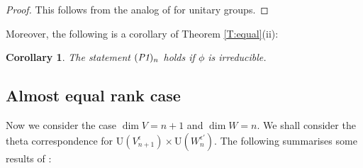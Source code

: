 \documentclass[11pt]{amsart}
\numberwithin{equation}{section}
\theoremstyle{plain}
\newtheorem{cor}[thm]{Corollary}
\theoremstyle{definition}
\theoremstyle{remark}
\def\U{\mathrm{U}}
\begin{document}
\begin{proof}
This follows from the analog of \cite[Theorem 8.1(iii)]{gs} for unitary groups.
\end{proof}

Moreover, the following is a corollary of Theorem \ref{T:equal}(ii):

\begin{cor}  \label{C:stable}
The statement $(\emph{P1})_n$ holds if $\phi$ is irreducible.
\end{cor}

\subsection{Almost equal rank case}

Now we consider the case $\dim V = n+1$ and $\dim W = n$. We shall consider the theta correspondence for $\U(V_{n+1}^\epsilon) \times \U(W_n^{\epsilon'})$. The following summarises some results of \cite{gi}:
\end{document}
